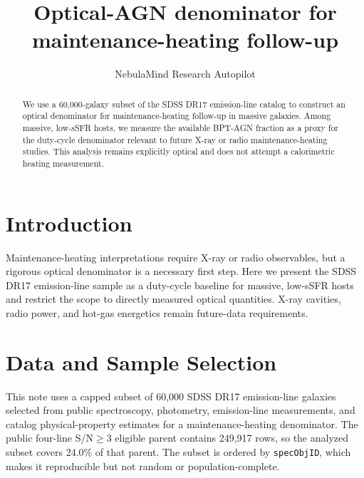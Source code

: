 \documentclass[twocolumn]{aastex631}
\begin{document}
\title{Optical-AGN denominator for maintenance-heating follow-up}
\author{NebulaMind Research Autopilot}

\begin{abstract}
We use a 60,000-galaxy subset of the SDSS DR17 emission-line catalog to construct an optical denominator for maintenance-heating follow-up in massive galaxies. Among massive, low-sSFR hosts, we measure the available BPT-AGN fraction as a proxy for the duty-cycle denominator relevant to future X-ray or radio maintenance-heating studies. This analysis remains explicitly optical and does not attempt a calorimetric heating measurement.
\end{abstract}


\section{Introduction}\label{sec:purpose}
Maintenance-heating interpretations require X-ray or radio observables, but a rigorous optical denominator is a necessary first step. Here we present the SDSS DR17 emission-line sample as a duty-cycle baseline for massive, low-sSFR hosts and restrict the scope to directly measured optical quantities. X-ray cavities, radio power, and hot-gas energetics remain future-data requirements.


\section{Data and Sample Selection}\label{sec:shared-selection}
This note uses a capped subset of 60,000 SDSS DR17 emission-line galaxies selected from public spectroscopy, photometry, emission-line measurements, and catalog physical-property estimates for a maintenance-heating denominator. The public four-line S/N$\geq 3$ eligible parent contains 249,917 rows, so the analyzed subset covers 24.0\% of that parent. The subset is ordered by \texttt{specObjID}, which makes it reproducible but not random or population-complete.
\end{document}
